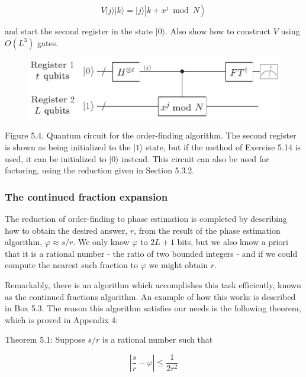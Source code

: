 \begin{equation*}
V|j\rangle|k\rangle=|j\rangle\left|k+x^{j} \bmod N\right\rangle \tag{5.47}
\end{equation*}

and start the second register in the state $|0\rangle$. Also show how to construct $V$ using $O\left(L^{3}\right)$ gates.

\begin{figure}
\centering
\includegraphics[width=0.75\linewidth]{Images/2024_05_17_6977ce60de6fd27aef98g-263}
\end{figure}

Figure 5.4. Quantum circuit for the order-finding algorithm. The second register is shown as being initialized to the $|1\rangle$ state, but if the method of Exercise 5.14 is used, it can be initialized to $|0\rangle$ instead. This circuit can also be used for factoring, using the reduction given in Section 5.3.2.

\subsubsection*{The continued fraction expansion}

The reduction of order-finding to phase estimation is completed by describing how to obtain the desired answer, $r$, from the result of the phase estimation algorithm, $\varphi \approx s / r$. We only know $\varphi$ to $2 L+1$ bits, but we also know a priori that it is a rational number - the ratio of two bounded integers - and if we could compute the nearest such fraction to $\varphi$ we might obtain $r$.

Remarkably, there is an algorithm which accomplishes this task efficiently, known as the continued fractions algorithm. An example of how this works is described in Box 5.3. The reason this algorithm satisfies our needs is the following theorem, which is proved in Appendix 4:

Theorem 5.1: Suppose $s / r$ is a rational number such that

\begin{equation*}
\left|\frac{s}{r}-\varphi\right| \leq \frac{1}{2 r^{2}} \tag{5.48}
\end{equation*}

